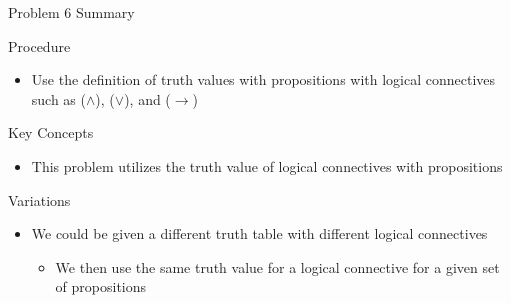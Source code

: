 \begin{summary}{Problem 6 Summary}
    \begin{statement}{Procedure}
        \begin{itemize}
            \item Use the definition of truth values with propositions with logical connectives such as ($\wedge$), ($\vee$), and ($\rightarrow$)
        \end{itemize}
    \end{statement}
    \begin{statement}{Key Concepts}
        \begin{itemize}
            \item This problem utilizes the truth value of logical connectives with propositions
        \end{itemize}
    \end{statement}
    \begin{statement}{Variations}
        \begin{itemize}
            \item We could be given a different truth table with different logical connectives
            \begin{itemize}
                \item We then use the same truth value for a logical connective for a given set of propositions
            \end{itemize}
        \end{itemize}
    \end{statement}
\end{summary}

